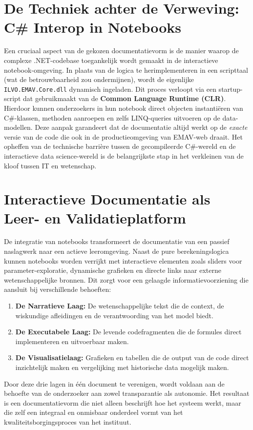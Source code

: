 \section{De Techniek achter de Verweving: C\# Interop in Notebooks}
Een cruciaal aspect van de gekozen documentatievorm is de manier waarop de complexe .NET-codebase toegankelijk wordt gemaakt in de interactieve notebook-omgeving. In plaats van de logica te herimplementeren in een scripttaal (wat de betrouwbaarheid zou ondermijnen), wordt de eigenlijke \texttt{ILVO.EMAV.Core.dll} dynamisch ingeladen.
Dit proces verloopt via een startup-script dat gebruikmaakt van de \textbf{Common Language Runtime (CLR)}. Hierdoor kunnen onderzoekers in hun notebook direct objecten instantiëren van C\#-klassen, methoden aanroepen en zelfs LINQ-queries uitvoeren op de data-modellen. Deze aanpak garandeert dat de documentatie altijd werkt op de \textit{exacte} versie van de code die ook in de productieomgeving van EMAV-web draait. Het opheffen van de technische barrière tussen de gecompileerde C\#-wereld en de interactieve data science-wereld is de belangrijkste stap in het verkleinen van de kloof tussen IT en wetenschap.
\section{Interactieve Documentatie als Leer- en Validatieplatform}
De integratie van notebooks transformeert de documentatie van een passief naslagwerk naar een actieve leeromgeving. Naast de pure berekeningslogica kunnen notebooks worden verrijkt met interactieve elementen zoals sliders voor parameter-exploratie, dynamische grafieken en directe links naar externe wetenschappelijke bronnen. 
Dit zorgt voor een gelaagde informatievoorziening die aansluit bij verschillende behoeften:
\begin{enumerate}
    \item \textbf{De Narratieve Laag:} De wetenschappelijke tekst die de context, de wiskundige afleidingen en de verantwoording van het model biedt.
    \item \textbf{De Executabele Laag:} De levende codefragmenten die de formules direct implementeren en uitvoerbaar maken.
    \item \textbf{De Visualisatielaag:} Grafieken en tabellen die de output van de code direct inzichtelijk maken en vergelijking met historische data mogelijk maken.
\end{enumerate}
Door deze drie lagen in één document te verenigen, wordt voldaan aan de behoefte van de onderzoeker aan zowel transparantie als autonomie. Het resultaat is een documentatievorm die niet alleen beschrijft hoe het systeem werkt, maar die zelf een integraal en onmisbaar onderdeel vormt van het kwaliteitsborgingsproces van het instituut.
